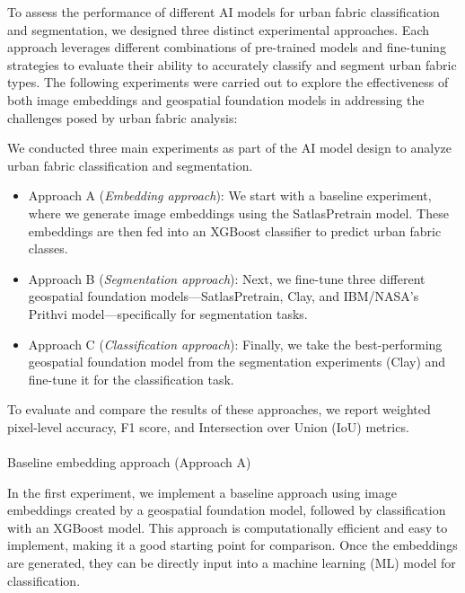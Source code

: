 \documentclass[
  letterpaper,
  DIV=11,
  numbers=noendperiod]{scrartcl}
\makeatletter
\let\oldparagraph\paragraph
\renewcommand{\paragraph}{
    \@ifstar
      \xxxParagraphStar
      \xxxParagraphNoStar
  }
\newcommand{\xxxParagraphStar}[1]{\oldparagraph*{#1}\mbox{}}
\newcommand{\xxxParagraphNoStar}[1]{\oldparagraph{#1}\mbox{}}
\makeatother
\begin{document}
To assess the performance of different AI models for urban fabric
classification and segmentation, we designed three distinct experimental
approaches. Each approach leverages different combinations of
pre-trained models and fine-tuning strategies to evaluate their ability
to accurately classify and segment urban fabric types. The following
experiments were carried out to explore the effectiveness of both image
embeddings and geospatial foundation models in addressing the challenges
posed by urban fabric analysis:

We conducted three main experiments as part of the AI model design to
analyze urban fabric classification and segmentation.

\begin{itemize}
\item
  Approach A (\emph{Embedding approach}): We start with a baseline
  experiment, where we generate image embeddings using the
  SatlasPretrain model. These embeddings are then fed into an XGBoost
  classifier to predict urban fabric classes.
\item
  Approach B (\emph{Segmentation approach}): Next, we fine-tune three
  different geospatial foundation models---SatlasPretrain, Clay, and
  IBM/NASA's Prithvi model---specifically for segmentation tasks.
\item
  Approach C (\emph{Classification approach}): Finally, we take the
  best-performing geospatial foundation model from the segmentation
  experiments (Clay) and fine-tune it for the classification task.
\end{itemize}

To evaluate and compare the results of these approaches, we report
weighted pixel-level accuracy, F1 score, and Intersection over Union
(IoU) metrics.

\paragraph{Baseline embedding approach (Approach
A)}\label{baseline-embedding-approach-approach-a}

In the first experiment, we implement a baseline approach using image
embeddings created by a geospatial foundation model, followed by
classification with an XGBoost model. This approach is computationally
efficient and easy to implement, making it a good starting point for
comparison. Once the embeddings are generated, they can be directly
input into a machine learning (ML) model for classification.
\end{document}
